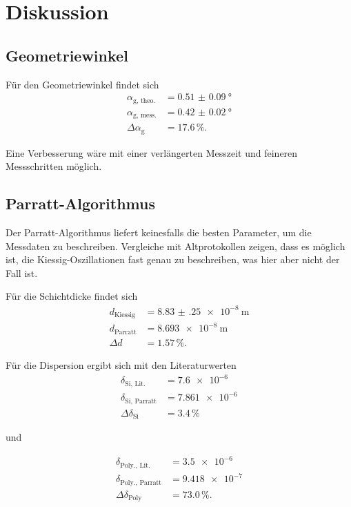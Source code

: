 \section{Diskussion}
\label{sec:Diskussion}

\subsection{Geometriewinkel}

Für den Geometriewinkel findet sich
\begin{align*}
    \alpha_\text{g, theo.} &= \qty{0.51(9)}{\degree} \\
    \alpha_\text{g, mess.} &= \qty{0.42(2)}{\degree} \\
    \Delta \alpha_\text{g} &= \num{17.6} \, \%.
\end{align*}

Eine Verbesserung wäre mit einer verlängerten Messzeit und feineren Messschritten möglich.

\subsection{Parratt-Algorithmus}

Der Parratt-Algorithmus liefert keinesfalls die besten Parameter, um die Messdaten zu beschreiben. Vergleiche mit Altprotokollen zeigen,
dass es möglich ist, die Kiessig-Oszillationen fast genau zu beschreiben, was hier aber nicht der Fall ist.

Für die Schichtdicke findet sich
\begin{align*}
    d_\text{Kiessig} &= \qty{8.83(25)e-8}{\meter} \\
    d_\text{Parratt} &= \qty{8.693e-8}{\meter} \\
    \Delta d &= \num{1.57} \, \%.
\end{align*}

Für die Dispersion ergibt sich mit den Literaturwerten
\begin{align*}
    \delta_\text{Si, Lit.} &= \num{7.6e-6} \\
    \delta_\text{Si, Parratt} &= \num{7.861e-6} \\
    \Delta \delta_\text{Si} &= \num{3.4} \, \%
\end{align*}

und

\begin{align*}
    \delta_\text{Poly., Lit.} &= \num{3.5e-6} \\
    \delta_\text{Poly., Parratt} &= \num{9.418e-7} \\
    \Delta \delta_\text{Poly} &= \num{73.0} \, \%.
\end{align*}

